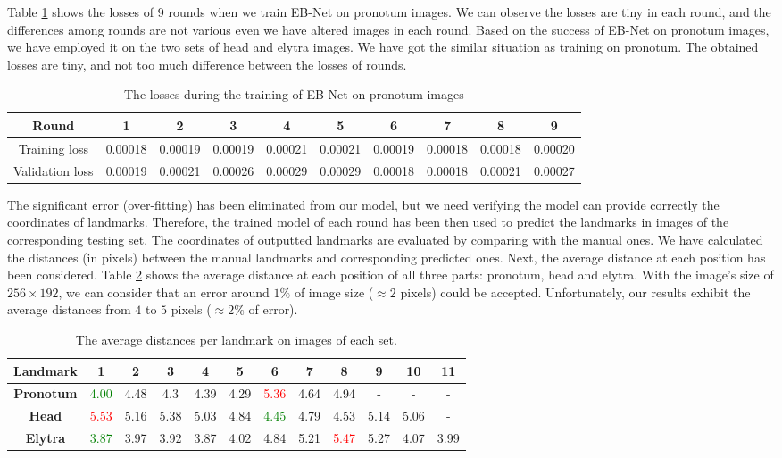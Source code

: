 \documentclass[review]{elsarticle}
\begin{document}
Table \ref{tbltrainingloss} shows the losses of 9 rounds when we train EB-Net on pronotum images. We can observe the losses are tiny in each round, and the differences among rounds are not various even we have altered images in each round. Based on the success of EB-Net on pronotum images, we have employed it on the two sets of head and elytra images. We have got the similar situation as training on pronotum. The obtained losses are tiny, and not too much difference between the losses of rounds.

\begin{table}[h!]
	\centering
	\begin{tabular}{| c | c | c | c | c | c | c | c | c | c |}
	\hline
	Round & 1 & 2 & 3 & 4 & 5 & 6 & 7 & 8 & 9 \\ \hline
Training loss & 0.00018 & 0.00019 & 0.00019 & 0.00021 & 0.00021 & 0.00019 & 0.00018 & 0.00018 & 0.00020 \\ \hline
Validation loss & 0.00019 & 0.00021 & 0.00026 & 0.00029 & 0.00029 & 0.00018 & 0.00018 & 0.00021 & 0.00027 \\ \hline
	\end{tabular}
	\caption{The losses during the training of EB-Net on pronotum images}
	\label{tbltrainingloss}
\end{table}

The significant error (over-fitting) has been eliminated from our model, but we need verifying the model can provide correctly the coordinates of landmarks. Therefore, the trained model of each round has been then used to predict the landmarks in images of the corresponding testing set. The coordinates of outputted landmarks are evaluated by comparing with the manual ones. We have calculated the distances (in pixels) between the manual landmarks and corresponding predicted ones. Next, the average distance at each position has been considered. Table \ref{tblavgpronotum} shows the average distance at each position of all three parts: pronotum, head and elytra. With the image's size of $256 \times 192$, we can consider that an error around $1\%$ of image size ($\approx 2$ pixels) could be accepted. Unfortunately, our results exhibit the average distances from $4$ to $5$ pixels ($\approx 2\%$ of error).

\begin{table}[h!]
	\centering	
	\begin{tabular}{|c|c|c|c|c|c|c|c|c|c|c|c|}
		\hline
		\textbf{Landmark} & 1 & 2 & 3 & 4 & 5 & 6 & 7 & 8 & 9 & 10 & 11 \\ \hline
		\textbf{Pronotum} & \textcolor{green}{4.00} & 4.48 & 4.3 & 4.39 & 4.29 & \textcolor{red}{5.36} & 4.64 & 4.94 & - & - & - \\ \hline
		\textbf{Head} & \textcolor{red}{5.53} & 5.16 & 5.38 & 5.03 & 4.84 & \textcolor{green}{4.45} & 4.79 & 4.53 & 5.14 & 5.06 & - \\ \hline
		\textbf{Elytra} & \textcolor{green}{3.87} & 3.97 & 3.92 & 3.87 & 4.02 & 4.84 & 5.21 & \textcolor{red}{5.47} & 5.27 & 4.07 & 3.99 \\ \hline
	\end{tabular}
	\caption{The average distances per landmark on images of each set.}
	\label{tblavgpronotum}
\end{table}
\end{document}
